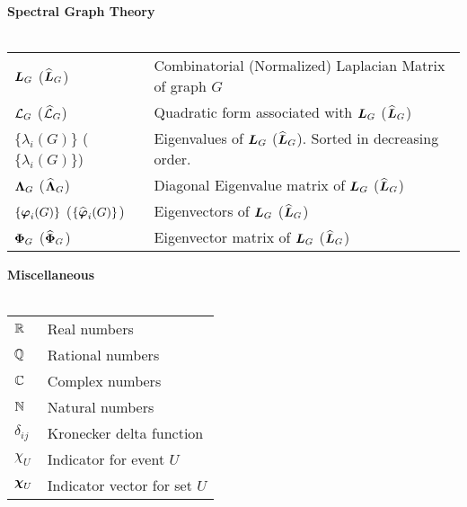 \noindent \textbf{Spectral Graph Theory}\\ 
\vspace{\headingsep} \\
\begin{tabular}{p{\colwidth}l}
	{$\vb*{L}_G$ ($\widehat{\vb*{L}}_G$)} & {Combinatorial (Normalized) Laplacian Matrix of graph $G$} \\
	{$\mathcal{L}_G$ ($\widehat{\mathcal{L}}_G$)} & Quadratic form associated with $\vb*{L}_G$ ($\widehat{\vb*{L}}_G$)\\
	$\{\lambda_i(G)\}$ ($\{\lambda_i(G)\}$) & Eigenvalues of $\vb*{L}_G$ ($\widehat{\vb*{L}}_G$). Sorted in decreasing order. \\
	$\vb{\Lambda}_G$ ($\widehat{\vb{\Lambda}}_G$) & Diagonal Eigenvalue matrix of $\vb*{L}_G$ ($\widehat{\vb*{L}}_G$) \\
	$\{\vb*{\varphi}_i(G)\}$ ($\{\widehat{\vb*{\varphi}}_i(G)\}$) & Eigenvectors of $\vb*{L}_G$ ($\widehat{\vb*{L}}_G$)\\
	{$\boldsymbol{\Phi}_G$ ($\widehat{\boldsymbol{\Phi}}_G$)} & Eigenvector matrix of $\vb*{L}_G$ ($\widehat{\vb*{L}}_G$)
\end{tabular}
\vspace{\groupsep}

\noindent \textbf{Miscellaneous}\\ 
\vspace{\headingsep} \\
\begin{tabular}{p{\colwidth}l}
	$\mathbb{R}$ & Real numbers\\
	$\mathbb{Q}$ & Rational numbers\\
	$\mathbb{C}$ & Complex numbers\\
	$\mathbb{N}$ & Natural numbers\\
	$\delta_{ij}$ & Kronecker delta function \\
	$\chi_U$ & Indicator for event $U$\\
	$\boldsymbol{\chi}_U$ & Indicator vector for set $U$ 
\end{tabular}